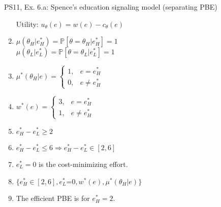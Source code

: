 \begin{frame}{PS11, Ex. 6.a: Spence’s education signaling model (separating PBE)}
\begin{multicols}{2}
\begin{enumerate}
        \item[Utility:] \vspace{-4pt}$u_\theta(e)=w(e)-c_\theta(e)$
        \item \vspace{-2pt}$\mu\left(\theta_H|e_H^*\right)=
               \mathbb{P}\left[\theta=\theta_H|e_H^*\right]=1$\\
              $\mu\left(\theta_L|e_L^*\right)=
               \mathbb{P}\left[\theta=\theta_L|e_L^*\right]=1$
        \item \vspace{-2pt}$\mu^*(\theta_H|e)=\left\{\begin{array}{ll}
                  1, & e = e_H^* \\
                  0, & e \neq e_H^*
               \end{array}\right.$
        \item \vspace{-2pt}$w^*(e)=\left\{\begin{array}{ll}
                  3, & e = e_H^* \\
                  1, & e \neq e_H^*
               \end{array}\right.$
        \item \vspace{-1pt}$e_H^*-e_L^*\geq2$
        \item \vspace{-1pt}$e_H^*-e_L^*\leq6\Rightarrow e_H^*-e_L^*\in[2,6]$
        \item \vspace{-1pt}$e_L^*=0$ is the cost-minimizing effort.
        \item \vspace{-1pt}$\{e_H^*\in[2,6],e_L^*$=$0,w^*(e),\mu^*(\theta_H|e)\}$
        \item \vspace{-1pt}The efficient PBE is for $e_H^*=2$.
      \end{enumerate}
    \end{multicols}
    \vfill\null
\end{frame}
